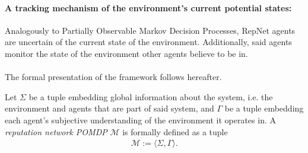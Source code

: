     \paragraph{A tracking mechanism of the environment's current potential states:} Analogously to Partially Observable Markov Decision Processes, RepNet agents are uncertain of the current state of the environment. Additionally, said agents monitor the state of the environment other agents believe to be in. 


\paragraph*{}The formal presentation of the framework follows hereafter.

\begin{definition}\label{def:name}
Let $\Sigma$ be a tuple embedding global information about the system, i.e. the environment and agents that are part of said system, and $\Gamma$ be a tuple embedding each agent's subjective understanding of the environment it operates in. 
A \textit{reputation network POMDP} $\mathcal{M}$ is formally defined as a tuple
  \begin{align*}
    \mathcal{M} := \big \langle \Sigma, \Gamma \big \rangle.
  \end{align*}

\end{definition}

